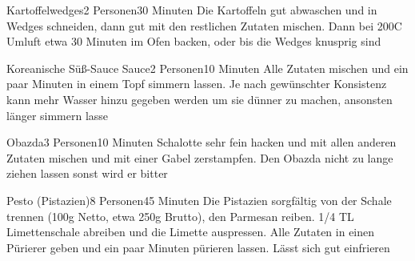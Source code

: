 
\begin{recipe}{Kartoffelwedges}{2 Personen}{30 Minuten}
Die Kartoffeln gut abwaschen und in Wedges schneiden, dann gut mit den restlichen Zutaten mischen. Dann bei 200\0C Umluft etwa 30 Minuten im Ofen backen, oder bis die Wedges knusprig sind
\end{recipe}


\begin{recipe}{Koreanische Süß-Sauce Sauce}{2 Personen}{10 Minuten}
Alle Zutaten mischen und ein paar Minuten in einem Topf simmern lassen. Je nach gewünschter Konsistenz kann mehr Wasser hinzu gegeben werden um sie dünner zu machen, ansonsten länger simmern lasse 
\end{recipe}


\begin{recipe}{Obazda}{3 Personen}{10 Minuten}
Schalotte sehr fein hacken und mit allen anderen Zutaten mischen und mit einer Gabel zerstampfen. Den Obazda nicht zu lange ziehen lassen sonst wird er bitter
\end{recipe}


\begin{recipe}{Pesto (Pistazien)}{8 Personen}{45 Minuten}
Die Pistazien sorgfältig von der Schale trennen (100g Netto, etwa 250g Brutto), den Parmesan reiben. 1/4 TL Limettenschale abreiben und die Limette auspressen. Alle Zutaten in einen Pürierer geben und ein paar Minuten pürieren lassen. Lässt sich gut einfrieren
\end{recipe} 

